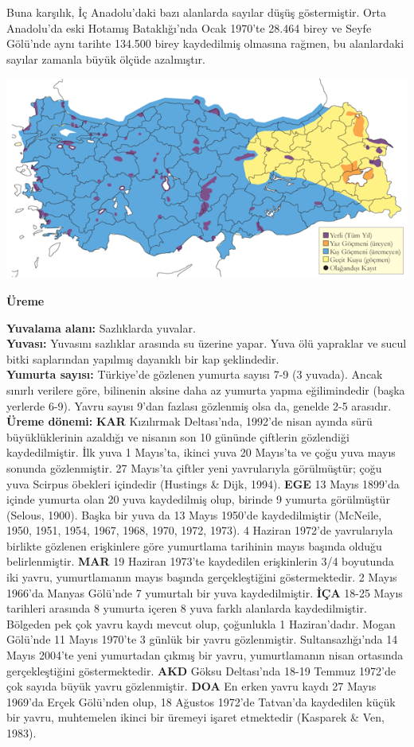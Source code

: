 \documentclass[
  a4paper,
  DIV=11,
  numbers=noendperiod]{scrreprt}
\begin{document}
Buna karşılık, İç Anadolu'daki bazı alanlarda sayılar düşüş
göstermiştir. Orta Anadolu'da eski Hotamış Bataklığı'nda Ocak 1970'te
28.464 birey ve Seyfe Gölü'nde aynı tarihte 134.500 birey kaydedilmiş
olmasına rağmen, bu alanlardaki sayılar zamanla büyük ölçüde azalmıştır.

\includegraphics{images/harita_Page_123.png}

\textbf{Üreme}

\textbf{Yuvalama alanı:} Sazlıklarda yuvalar.\\
\textbf{Yuvası:} Yuvasını sazlıklar arasında su üzerine yapar. Yuva ölü
yapraklar ve sucul bitki saplarından yapılmış dayanıklı bir kap
şeklindedir.\\
\textbf{Yumurta sayısı:} Türkiye'de gözlenen yumurta sayısı 7-9 (3
yuvada). Ancak sınırlı verilere göre, bilinenin aksine daha az yumurta
yapma eğilimindedir (başka yerlerde 6-9). Yavru sayısı 9'dan fazlası
gözlenmiş olsa da, genelde 2-5 arasıdır.\\
\textbf{Üreme dönemi:} \textbf{KAR} Kızılırmak Deltası'nda, 1992'de
nisan ayında sürü büyüklüklerinin azaldığı ve nisanın son 10 gününde
çiftlerin gözlendiği kaydedilmiştir. İlk yuva 1 Mayıs'ta, ikinci yuva 20
Mayıs'ta ve çoğu yuva mayıs sonunda gözlenmiştir. 27 Mayıs'ta çiftler
yeni yavrularıyla görülmüştür; çoğu yuva Scirpus öbekleri içindedir
(Hustings \& Dijk, 1994). \textbf{EGE} 13 Mayıs 1899'da içinde yumurta
olan 20 yuva kaydedilmiş olup, birinde 9 yumurta görülmüştür (Selous,
1900). Başka bir yuva da 13 Mayıs 1950'de kaydedilmiştir (McNeile, 1950,
1951, 1954, 1967, 1968, 1970, 1972, 1973). 4 Haziran 1972'de
yavrularıyla birlikte gözlenen erişkinlere göre yumurtlama tarihinin
mayıs başında olduğu belirlenmiştir. \textbf{MAR} 19 Haziran 1973'te
kaydedilen erişkinlerin 3/4 boyutunda iki yavru, yumurtlamanın mayıs
başında gerçekleştiğini göstermektedir. 2 Mayıs 1966'da Manyas Gölü'nde
7 yumurtalı bir yuva kaydedilmiştir. \textbf{İÇA} 18-25 Mayıs tarihleri
arasında 8 yumurta içeren 8 yuva farklı alanlarda kaydedilmiştir.
Bölgeden pek çok yavru kaydı mevcut olup, çoğunlukla 1 Haziran'dadır.
Mogan Gölü'nde 11 Mayıs 1970'te 3 günlük bir yavru gözlenmiştir.
Sultansazlığı'nda 14 Mayıs 2004'te yeni yumurtadan çıkmış bir yavru,
yumurtlamanın nisan ortasında gerçekleştiğini göstermektedir.
\textbf{AKD} Göksu Deltası'nda 18-19 Temmuz 1972'de çok sayıda büyük
yavru gözlenmiştir. \textbf{DOA} En erken yavru kaydı 27 Mayıs 1969'da
Erçek Gölü'nden olup, 18 Ağustos 1972'de Tatvan'da kaydedilen küçük bir
yavru, muhtemelen ikinci bir üremeyi işaret etmektedir (Kasparek \& Ven,
1983).
\end{document}
